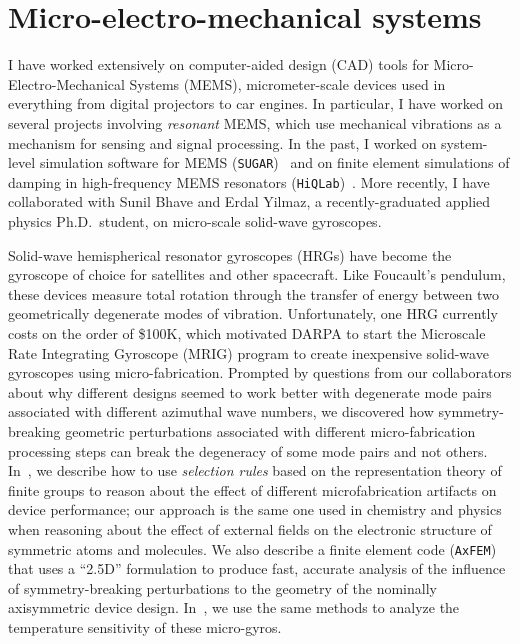 \documentclass[11pt]{amsart}
\begin{document}
\section{Micro-electro-mechanical systems}
\label{sec-engineering}

I have worked extensively on computer-aided design (CAD) tools for
Micro-Electro-Mechanical Systems (MEMS), micrometer-scale devices used
in everything from digital projectors to car engines.  In particular,
I have worked on several projects involving {\em resonant} MEMS, which use
mechanical vibrations as a mechanism for sensing and signal processing.
In the past, I
worked on system-level simulation software for MEMS
({\tt SUGAR})~\cite{2002-mems,2001-sugar,2001-msm,2000-mems}
and on finite element simulations of damping in high-frequency
MEMS resonators
({\tt HiQLab})~\cite{2012-mems-opt,2005-sensors,2005-ijnme,2005-mems,2004-para}.
More recently, I have collaborated with Sunil Bhave and
Erdal Yilmaz, a recently-graduated applied physics Ph.D.~student,
on micro-scale solid-wave gyroscopes.

Solid-wave hemispherical resonator gyroscopes (HRGs) have become the
gyroscope of choice for satellites and other spacecraft.  Like
Foucault's pendulum, these devices measure total rotation through the
transfer of energy between two geometrically degenerate modes of
vibration. Unfortunately, one HRG currently costs on the order of
\$100K, which motivated DARPA to start the Microscale Rate Integrating
Gyroscope (MRIG) program to create inexpensive solid-wave gyroscopes
using micro-fabrication. Prompted by questions from our collaborators
about why different designs seemed to work better with degenerate mode
pairs associated with different azimuthal wave numbers, we discovered
how symmetry-breaking geometric perturbations associated with different
micro-fabrication processing steps can break the degeneracy of some mode
pairs and not others. In~\cite{2013-sensors}, we describe how to use
{\em selection rules} based on the representation theory of finite
groups to reason about the effect of different microfabrication
artifacts on device performance; our approach is the same one used in
chemistry and physics when reasoning about the effect of external fields
on the electronic structure of symmetric atoms and molecules.  We also
describe a finite element code ({\tt AxFEM}) that uses a ``2.5D''
formulation to produce fast, accurate analysis of the influence of
symmetry-breaking perturbations to the geometry of the nominally
axisymmetric device design.  In~\cite{2016-sensors,2016-hh-workshop}, we
use the same methods to analyze the temperature sensitivity of these
micro-gyros.
\end{document}
